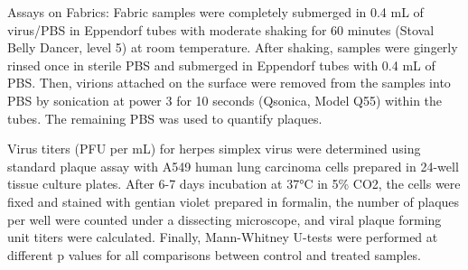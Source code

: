 \documentclass[10pt,letterpaper]{article}
\begin{document}
Assays on Fabrics: Fabric samples were completely submerged in 0.4 mL of virus/PBS in Eppendorf tubes with moderate shaking for 60 minutes (Stoval Belly Dancer, level 5) at room temperature. %
After shaking, samples were gingerly rinsed once in sterile PBS and submerged in Eppendorf tubes with 0.4 mL of PBS. Then, virions attached on the surface were removed from the samples into PBS by sonication at power 3 for 10 seconds (Qsonica, Model Q55) within the tubes. The remaining PBS was used to quantify plaques. 

Virus titers (PFU per mL) for herpes simplex virus were determined using standard plaque assay with A549 human lung carcinoma cells prepared in 24-well tissue culture plates. After 6-7 days incubation at 37°C in 5\% CO2, the cells were fixed and stained with gentian violet prepared in formalin, the number of plaques per well were counted under a dissecting microscope, and viral plaque forming unit titers were calculated. 
Finally, Mann-Whitney U-tests were performed at different p values for all comparisons between control and treated samples.




\end{document}
